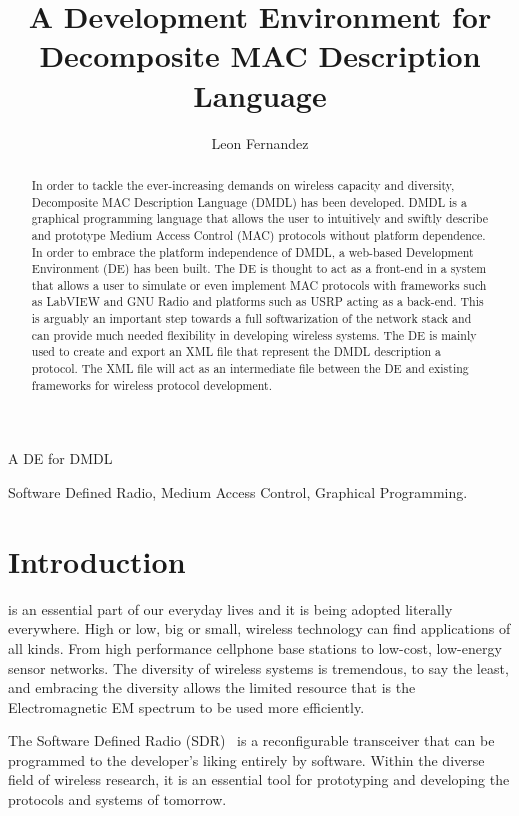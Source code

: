 \documentclass[journal,comsoc]{IEEEtran}
\begin{document}
\title{A Development Environment for Decomposite MAC Description Language}
\author{Leon Fernandez}
%
{A DE for DMDL}
\maketitle

\begin{abstract}
In order to tackle the ever-increasing demands on wireless capacity and diversity,
Decomposite MAC Description Language (DMDL) has been developed. DMDL is a graphical
programming language that allows the user to intuitively and swiftly describe and
prototype Medium Access Control (MAC) protocols without platform dependence.
In order to embrace the platform independence of DMDL, a web-based Development Environment (DE)
has been built. The DE is thought to act as a front-end in a system that allows a user to
simulate or even implement MAC protocols with frameworks such as LabVIEW and GNU Radio and
platforms such as USRP acting as a back-end. This is arguably an important step towards a
full softwarization of the network stack and can provide much needed flexibility in developing
wireless systems. The DE is mainly used to create and export an XML file that represent the DMDL
description a protocol. The XML file will act as an intermediate file between the DE and existing
frameworks for wireless protocol development.

\end{abstract}

\begin{IEEEkeywords}
Software Defined Radio, Medium Access Control, Graphical Programming.
\end{IEEEkeywords}

\section{Introduction}
 is an essential part of our everyday lives and it is
being adopted literally everywhere. High or low, big or small, wireless technology can
find applications of all kinds. From high performance cellphone base stations to low-cost,
low-energy sensor networks. The diversity of wireless systems is tremendous, to say the least,
and embracing the diversity allows the limited resource that is the Electromagnetic EM spectrum to
be used more efficiently.

The Software Defined Radio (SDR)~\cite{sdr} is a reconfigurable transceiver that can be programmed
to the developer's liking entirely by software. Within the diverse field of wireless research,
it is an essential tool for prototyping and developing the protocols and systems of tomorrow.
\end{document}
